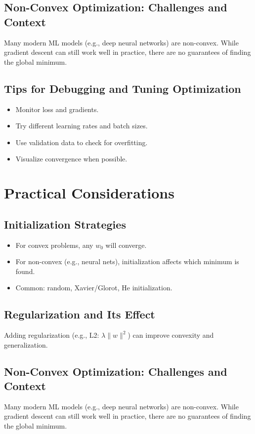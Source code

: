\documentclass{article}
\begin{document}
\subsection{Non-Convex Optimization: Challenges and Context}
Many modern ML models (e.g., deep neural networks) are non-convex. While gradient descent can still work well in practice, there are no guarantees of finding the global minimum.

\subsection{Tips for Debugging and Tuning Optimization}
\begin{itemize}
    \item Monitor loss and gradients.
    \item Try different learning rates and batch sizes.
    \item Use validation data to check for overfitting.
    \item Visualize convergence when possible.
\end{itemize}
\section{Practical Considerations}

\subsection{Initialization Strategies}
\begin{itemize}
    \item For convex problems, any $w_0$ will converge.
    \item For non-convex (e.g., neural nets), initialization affects which minimum is found.
    \item Common: random, Xavier/Glorot, He initialization.
\end{itemize}

\subsection{Regularization and Its Effect}
Adding regularization (e.g., L2: $\lambda \|w\|^2$) can improve convexity and generalization.

\subsection{Non-Convex Optimization: Challenges and Context}
Many modern ML models (e.g., deep neural networks) are non-convex. While gradient descent can still work well in practice, there are no guarantees of finding the global minimum.
\end{document}
